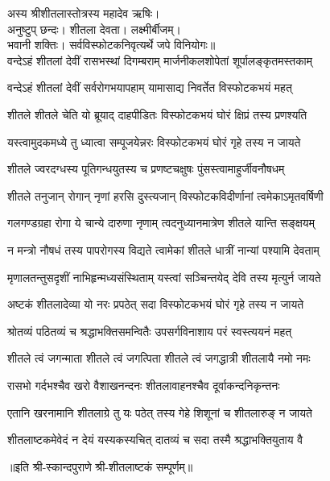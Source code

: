 
अस्य श्रीशीतलास्तोत्रस्य महादेव ऋषिः।\\
अनुष्टुप् छन्दः। शीतला देवता। लक्ष्मीर्बीजम्।\\
भवानी शक्तिः। सर्वविस्फोटकनिवृत्यर्थे जपे विनियोगः॥\\

\twolineshloka
{वन्देऽहं शीतलां देवीं रासभस्थां दिगम्बराम्}
{मार्जनीकलशोपेतां शूर्पालङ्कृतमस्तकाम्}

\twolineshloka
{वन्देऽहं शीतलां देवीं सर्वरोगभयापहाम्}
{यामासाद्य निवर्तेत विस्फोटकभयं महत्}

\twolineshloka
{शीतले शीतले चेति यो ब्रूयाद् दाहपीडितः}
{विस्फोटकभयं घोरं क्षिप्रं तस्य प्रणश्यति}

\twolineshloka
{यस्त्वामुदकमध्ये तु ध्यात्वा सम्पूजयेन्नरः}
{विस्फोटकभयं घोरं गृहे तस्य न जायते}

\twolineshloka
{शीतले ज्वरदग्धस्य पूतिगन्धयुतस्य च}
{प्रणष्टचक्षुषः पुंसस्त्वामाहुर्जीवनौषधम्}

\twolineshloka
{शीतले तनुजान् रोगान् नृणां हरसि दुस्त्यजान्}
{विस्फोटकविदीर्णानां त्वमेकाऽमृतवर्षिणी}

\twolineshloka
{गलगण्डग्रहा रोगा ये चान्ये दारुणा नृणाम्}
{त्वदनुध्यानमात्रेण शीतले यान्ति सङ्क्षयम्}

\twolineshloka
{न मन्त्रो नौषधं तस्य पापरोगस्य विद्यते}
{त्वामेकां शीतले धात्रीं नान्यां पश्यामि देवताम्}

\twolineshloka
{मृणालतन्तुसदृशीं नाभिहृन्मध्यसंस्थिताम्}
{यस्त्वां सञ्चिन्तयेद् देवि तस्य मृत्युर्न जायते}

\twolineshloka
{अष्टकं शीतलादेव्या यो नरः प्रपठेत् सदा}
{विस्फोटकभयं घोरं गृहे तस्य न जायते}

\twolineshloka
{श्रोतव्यं पठितव्यं च श्रद्धाभक्तिसमन्वितैः}
{उपसर्गविनाशाय परं स्वस्त्ययनं महत्}

\twolineshloka
{शीतले त्वं जगन्माता शीतले त्वं जगत्पिता}
{शीतले त्वं जगद्धात्री शीतलायै नमो नमः}

\twolineshloka
{रासभो गर्दभश्चैव खरो वैशाखनन्दनः}
{शीतलावाहनश्चैव दूर्वाकन्दनिकृन्तनः}

\twolineshloka
{एतानि खरनामानि शीतलाग्रे तु यः पठेत्}
{तस्य गेहे शिशूनां च शीतलारुङ् न जायते}

\twolineshloka
{शीतलाष्टकमेवेदं न देयं यस्यकस्यचित्}
{दातव्यं च सदा तस्मै श्रद्धाभक्तियुताय वै}

॥इति श्री-स्कान्दपुराणे श्री-शीतलाष्टकं सम्पूर्णम्॥